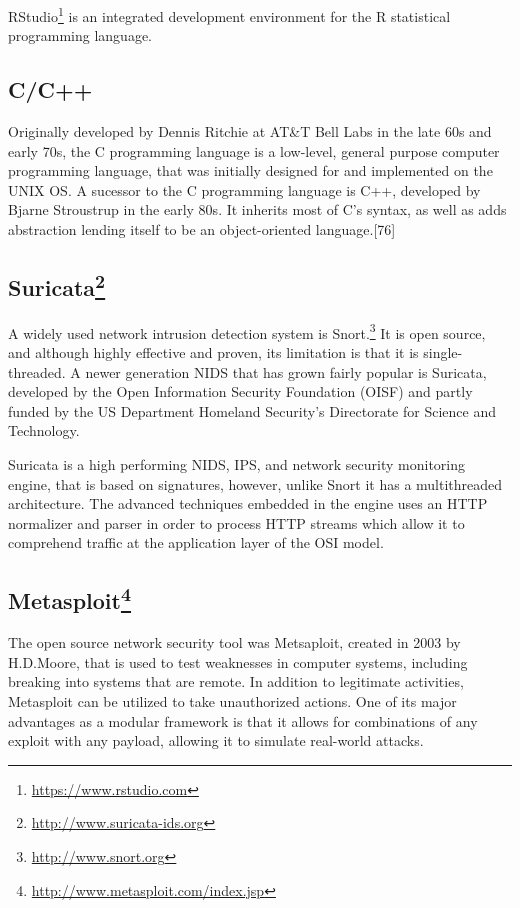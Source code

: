 \documentclass[11pt,a4paper]{article}
\let\rmarkdownfootnote\footnote%
\def\footnote{\protect\rmarkdownfootnote}
\begin{document}
RStudio\footnote{\url{https://www.rstudio.com}} is an integrated
development environment for the R statistical programming language.

\subsection*{C/C++}\label{cc}

Originally developed by Dennis Ritchie at AT\&T Bell Labs in the late
60s and early 70s, the C programming language is a low-level, general
purpose computer programming language, that was initially designed for
and implemented on the UNIX OS. A sucessor to the C programming language
is C++, developed by Bjarne Stroustrup in the early 80s. It inherits
most of C's syntax, as well as adds abstraction lending itself to be an
object-oriented language.{[}76{]}

\subsection*{Suricata\footnote{\url{http://www.suricata-ids.org}}}\label{suricata10}

A widely used network intrusion detection system is Snort.\footnote{\url{http://www.snort.org}}
It is open source, and although highly effective and proven, its
limitation is that it is single-threaded. A newer generation NIDS that
has grown fairly popular is Suricata, developed by the Open Information
Security Foundation (OISF) and partly funded by the US Department
Homeland Security's Directorate for Science and Technology.

Suricata is a high performing NIDS, IPS, and network security monitoring
engine, that is based on signatures, however, unlike Snort it has a
multithreaded architecture. The advanced techniques embedded in the
engine uses an HTTP normalizer and parser in order to process HTTP
streams which allow it to comprehend traffic at the application layer of
the OSI model.

\subsection*{Metasploit\footnote{\url{http://www.metasploit.com/index.jsp}}}\label{metasploit12}

The open source network security tool was Metsaploit, created in 2003 by
H.D.Moore, that is used to test weaknesses in computer systems,
including breaking into systems that are remote. In addition to
legitimate activities, Metasploit can be utilized to take unauthorized
actions. One of its major advantages as a modular framework is that it
allows for combinations of any exploit with any payload, allowing it to
simulate real-world attacks.
\end{document}
